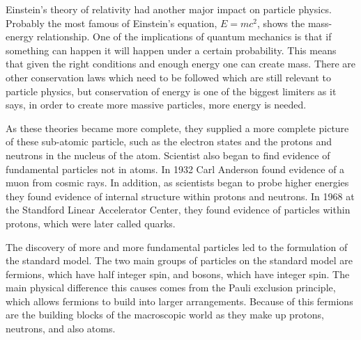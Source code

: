 Einstein's theory of relativity had another major impact on particle physics. Probably the most famous of Einstein's equation, $E = mc^2$, shows the mass-energy relationship. One of the implications of quantum mechanics is that if something can happen it will happen under a certain probability. This means that given the right conditions and enough energy one can create mass. There are other conservation laws which need to be followed which are still relevant to particle physics, but conservation of energy is one of the biggest limiters as it says, in order to create more massive particles, more energy is needed. 

As these theories became more complete, they supplied a more complete picture of these sub-atomic particle, such as the electron states and the protons and neutrons in the nucleus of the atom. Scientist also began to find evidence of fundamental particles not in atoms. In 1932 Carl Anderson found evidence of a muon from cosmic rays. In addition, as scientists began to probe higher energies they found evidence of internal structure within protons and neutrons. In 1968 at the Standford Linear Accelerator Center, they found evidence of particles within protons, which were later called quarks.

The discovery of more and more fundamental particles led to the formulation of the standard model. The two main groups of particles on the standard model are fermions, which have half integer spin, and bosons, which have integer spin. The main physical difference this causes comes from the Pauli exclusion principle, which allows fermions to build into larger arrangements. Because of this fermions are the building blocks of the macroscopic world as they make up protons, neutrons, and also atoms.   

